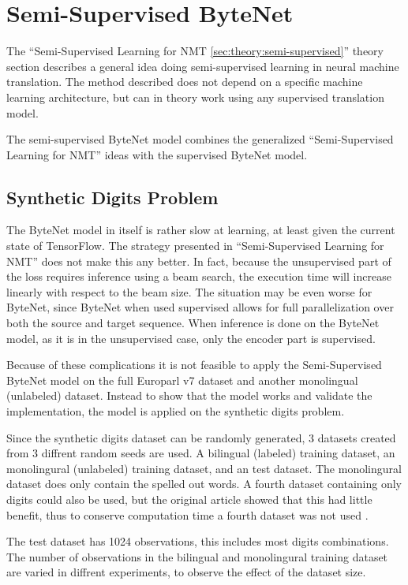 
\section{Semi-Supervised ByteNet}

The ``Semi-Supervised Learning for NMT \ref{sec:theory:semi-supervised}'' theory section describes a general idea doing semi-supervised learning in neural machine translation. The method described does not depend on a specific machine learning architecture, but can in theory work using any supervised translation model.

The semi-supervised ByteNet model combines the generalized ``Semi-Supervised Learning for NMT'' ideas with the supervised ByteNet model.

\subsection{Synthetic Digits Problem}

The ByteNet model in itself is rather slow at learning, at least given the current state of TensorFlow. The strategy presented in ``Semi-Supervised Learning for NMT'' does not make this any better. In fact, because the unsupervised part of the loss requires inference using a beam search, the execution time will increase linearly with respect to the beam size. The situation may be even worse for ByteNet, since ByteNet when used supervised allows for full parallelization over both the source and target sequence. When inference is done on the ByteNet model, as it is in the unsupervised case, only the encoder part is supervised.

Because of these complications it is not feasible to apply the Semi-Supervised ByteNet model on the full Europarl v7 dataset and another monolingual (unlabeled) dataset. Instead to show that the model works and validate the implementation, the model is applied on the synthetic digits problem.

Since the synthetic digits dataset can be randomly generated, 3 datasets created from 3 diffrent random seeds are used. A bilingual (labeled) training dataset, an monolingural (unlabeled) training dataset, and an test dataset. The monolingural dataset does only contain the spelled out words. A fourth dataset containing only digits could also be used, but the original article showed that this had little benefit, thus to conserve computation time a fourth dataset was not used \cite{semi-supervied}.

The test dataset has 1024 observations, this includes most digits combinations. The number of observations in the bilingual and monolingural training dataset are varied in diffrent experiments, to observe the effect of the dataset size.

